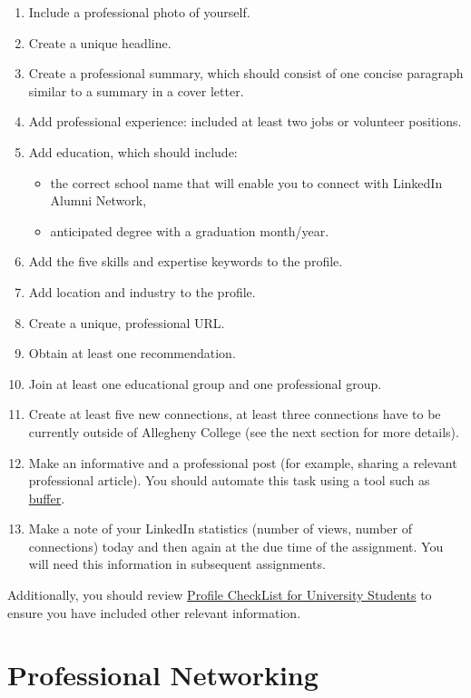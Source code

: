 \documentclass[11pt]{article}
\begin{document}
\begin{enumerate}
	\item Include a professional photo of yourself.
	\item Create a unique headline.
	\item Create a professional summary, which should consist of one concise paragraph similar  to a summary in a cover letter.
	\item Add professional experience: included at least two jobs or volunteer positions.
	\item Add education, which should include: 
	\begin{itemize}
		\item  the correct school name that will enable you to connect with LinkedIn Alumni Network,
		\item anticipated degree with a graduation month/year.
	\end{itemize}	 
	\item Add the five skills and expertise keywords to the profile.
	\item Add location and industry to the profile.
	\item Create a unique, professional URL.
	\item Obtain at least one recommendation.
	\item Join at least one educational group and one professional group.
	\item Create at least five new connections, at least three connections have to be currently outside of Allegheny College (see the next section for more details). 
	\item Make an informative and a professional post (for example, sharing a relevant professional article). You should automate this task using a tool such as \href{https://buffer.com/}{buffer}. 
	\item Make a note of your LinkedIn statistics (number of views, number of connections) today and then again at the due time of the assignment. You will need this information in subsequent assignments.
\end{enumerate}

Additionally, you should review \href{https://university.linkedin.com/content/dam/university/global/en_US/site/pdf/LinkedIn%20Profile%20Checklist%20-%20College%20Students.pdf}{Profile CheckList for University Students} to ensure you have included other relevant information.  

\section*{Professional Networking}
\end{document}
